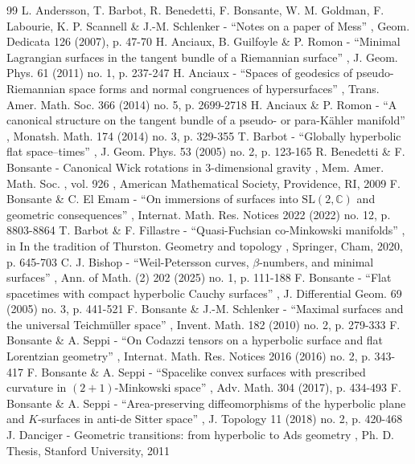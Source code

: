\begin{thebibliography}{99}
 L. Andersson, T. Barbot, R. Benedetti, F. Bonsante, W. M. Goldman, F. Labourie, K. P. Scannell \& J.-M. Schlenker - “Notes on a paper of Mess” , Geom. Dedicata 126 (2007), p. 47-70
 H. Anciaux, B. Guilfoyle \& P. Romon - “Minimal Lagrangian surfaces in the tangent bundle of a Riemannian surface” , J. Geom. Phys. 61 (2011) no. 1, p. 237-247
 H. Anciaux - “Spaces of geodesics of pseudo-Riemannian space forms and normal congruences of hypersurfaces” , Trans. Amer. Math. Soc. 366 (2014) no. 5, p. 2699-2718
 H. Anciaux \& P. Romon - “A canonical structure on the tangent bundle of a pseudo- or para-Kähler manifold” , Monatsh. Math. 174 (2014) no. 3, p. 329-355
 T. Barbot - “Globally hyperbolic flat space–times” , J. Geom. Phys. 53 (2005) no. 2, p. 123-165
 R. Benedetti \& F. Bonsante - Canonical Wick rotations in $3$-dimensional gravity , Mem. Amer. Math. Soc. , vol. 926 , American Mathematical Society, Providence, RI, 2009
 F. Bonsante \& C. El Emam - “On immersions of surfaces into $\mathrm{SL}(2,\mathbb{C})$ and geometric consequences” , Internat. Math. Res. Notices 2022 (2022) no. 12, p. 8803-8864
 T. Barbot \& F. Fillastre - “Quasi-Fuchsian co-Minkowski manifolds” , in In the tradition of Thurston. Geometry and topology , Springer, Cham, 2020, p. 645-703
 C. J. Bishop - “Weil-Petersson curves, $\beta $-numbers, and minimal surfaces” , Ann. of Math. (2) 202 (2025) no. 1, p. 111-188
 F. Bonsante - “Flat spacetimes with compact hyperbolic Cauchy surfaces” , J. Differential Geom. 69 (2005) no. 3, p. 441-521
 F. Bonsante \& J.-M. Schlenker - “Maximal surfaces and the universal Teichmüller space” , Invent. Math. 182 (2010) no. 2, p. 279-333
 F. Bonsante \& A. Seppi - “On Codazzi tensors on a hyperbolic surface and flat Lorentzian geometry” , Internat. Math. Res. Notices 2016 (2016) no. 2, p. 343-417
 F. Bonsante \& A. Seppi - “Spacelike convex surfaces with prescribed curvature in $(2+1)$-Minkowski space” , Adv. Math. 304 (2017), p. 434-493
 F. Bonsante \& A. Seppi - “Area-preserving diffeomorphisms of the hyperbolic plane and $K$-surfaces in anti-de Sitter space” , J. Topology 11 (2018) no. 2, p. 420-468
 J. Danciger - Geometric transitions: from hyperbolic to Ads geometry , Ph. D. Thesis, Stanford University, 2011

\end{thebibliography}
